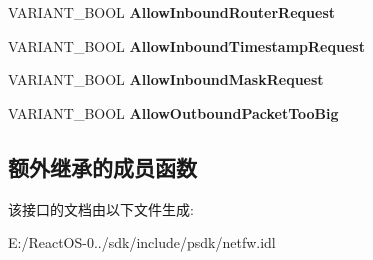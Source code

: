 \begin{DoxyCompactItemize}
V\+A\+R\+I\+A\+N\+T\+\_\+\+B\+O\+OL {\bfseries Allow\+Inbound\+Router\+Request}
\item 
\mbox{\label{interface_i_net_fw_icmp_settings_aa6d145a542ae8464b8681bd4b04443d8}} 
V\+A\+R\+I\+A\+N\+T\+\_\+\+B\+O\+OL {\bfseries Allow\+Inbound\+Timestamp\+Request}
\item 
\mbox{\label{interface_i_net_fw_icmp_settings_a5ac6f67546a42572c7136c81cc349b2d}} 
V\+A\+R\+I\+A\+N\+T\+\_\+\+B\+O\+OL {\bfseries Allow\+Inbound\+Mask\+Request}
\item 
\mbox{\label{interface_i_net_fw_icmp_settings_aef2727882acd4b5853c240bb5e8f851a}} 
V\+A\+R\+I\+A\+N\+T\+\_\+\+B\+O\+OL {\bfseries Allow\+Outbound\+Packet\+Too\+Big}
\end{DoxyCompactItemize}
\subsection*{额外继承的成员函数}


该接口的文档由以下文件生成\+:\begin{DoxyCompactItemize}
\item 
E\+:/\+React\+O\+S-\/0../sdk/include/psdk/netfw.\+idl\end{DoxyCompactItemize}
